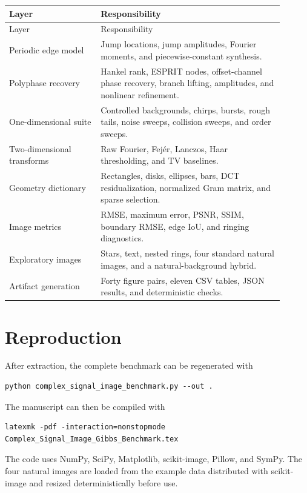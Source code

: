\documentclass[11pt,oneside,openany]{book}
\theoremstyle{definition}
\theoremstyle{remark}
\begin{document}
\begin{longtable}{L{0.30\linewidth}L{0.60\linewidth}}
\toprule
Layer & Responsibility\\
\midrule
\endfirsthead
\toprule Layer & Responsibility\\\midrule\endhead
Periodic edge model & Jump locations, jump amplitudes, Fourier moments, and piecewise-constant synthesis.\\
Polyphase recovery & Hankel rank, ESPRIT nodes, offset-channel phase recovery, branch lifting, amplitudes, and nonlinear refinement.\\
One-dimensional suite & Controlled backgrounds, chirps, bursts, rough tails, noise sweeps, collision sweeps, and order sweeps.\\
Two-dimensional transforms & Raw Fourier, Fej\'er, Lanczos, Haar thresholding, and TV baselines.\\
Geometry dictionary & Rectangles, disks, ellipses, bars, DCT residualization, normalized Gram matrix, and sparse selection.\\
Image metrics & RMSE, maximum error, PSNR, SSIM, boundary RMSE, edge IoU, and ringing diagnostics.\\
Exploratory images & Stars, text, nested rings, four standard natural images, and a natural-background hybrid.\\
Artifact generation & Forty figure pairs, eleven CSV tables, JSON results, and deterministic checks.\\
\bottomrule
\end{longtable}

\chapter{Reproduction}

After extraction, the complete benchmark can be regenerated with
\begin{lstlisting}
python complex_signal_image_benchmark.py --out .
\end{lstlisting}

The manuscript can then be compiled with
\begin{lstlisting}
latexmk -pdf -interaction=nonstopmode Complex_Signal_Image_Gibbs_Benchmark.tex
\end{lstlisting}

The code uses NumPy, SciPy, Matplotlib, scikit-image, Pillow, and SymPy. The four natural images are loaded from the example data distributed with scikit-image and resized deterministically before use.
\end{document}
